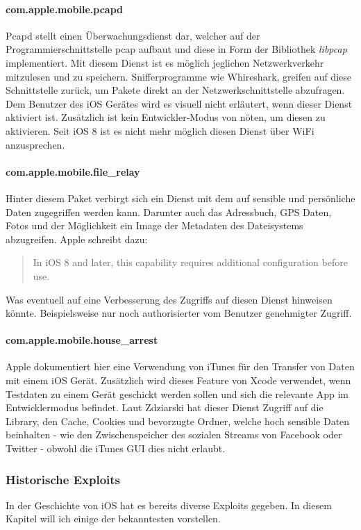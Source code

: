 		\paragraph{com.apple.mobile.pcapd}
			Pcapd stellt einen Überwachungsdienst dar, welcher auf der
			Programmierschnittstelle
			pcap\cite{PCAP2015} aufbaut und
			diese in Form der Bibliothek \textsl{libpcap} implementiert. Mit diesem
			Dienst ist es möglich jeglichen Netzwerkverkehr mitzulesen und zu speichern.
			Snifferprogramme wie Whireshark\cite{WHIRESHARK2015}, greifen auf
			diese Schnittstelle zurück, um Pakete direkt an der Netzwerkschnittstelle
			abzufragen. Dem Benutzer des iOS Gerätes wird es visuell nicht erläutert,
			wenn dieser Dienst aktiviert ist. Zusätzlich ist kein Entwickler-Modus von
			nöten, um diesen zu aktivieren. Seit iOS 8 ist es nicht mehr möglich diesen
			Dienst über WiFi anzusprechen.
		\paragraph{com.apple.mobile.file\_relay}
			Hinter diesem Paket verbirgt sich ein Dienst mit dem auf sensible und
			persönliche Daten zugegriffen werden kann. Darunter auch das Adressbuch, GPS
			Daten, Fotos und der Möglichkeit ein Image der Metadaten des Dateisystems
			abzugreifen. Apple schreibt dazu:
			\begin{quote}
				In iOS 8 and later, this capability requires additional configuration before
				use.\cite{AppleDiagnosticCap2015}
			\end{quote}
			Was eventuell auf eine Verbesserung des Zugriffs auf diesen Dienst hinweisen
			könnte. Beispielsweise nur noch authorisierter vom Benutzer genehmigter
			Zugriff.
		\paragraph{com.apple.mobile.house\_arrest}
			Apple dokumentiert hier eine Verwendung von iTunes für den Transfer von Daten
			mit einem iOS Gerät. Zusätzlich wird dieses Feature von Xcode verwendet,
			wenn Testdaten zu einem Gerät geschickt werden sollen und sich die relevante
			App im Entwicklermodus befindet. Laut Zdziarski hat dieser Dienst Zugriff auf
			die Library, den Cache, Cookies und bevorzugte Ordner, welche hoch sensible
			Daten beinhalten - wie den Zwischenspeicher des sozialen Streams von Facebook
			oder Twitter - obwohl die iTunes GUI dies nicht erlaubt.
			
	\subsubsection{Historische Exploits}
		In der Geschichte von iOS hat es bereits diverse Exploits\cite{Exploit2015}
		gegeben. In diesem Kapitel will ich einige der bekanntesten vorstellen.

